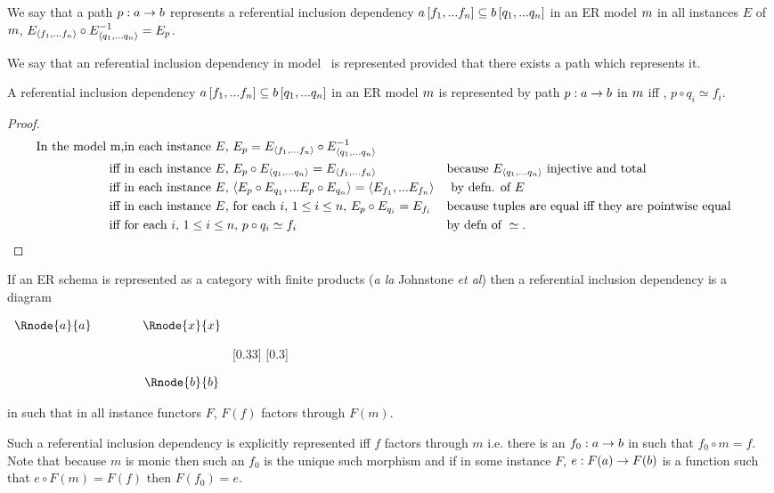 \begin{definition}
We say that a path $p:a \rightarrow b$ represents a referential inclusion dependency
$a\left[f_1,...f_n\right]\subseteq b\left[q_1,...q_n\right]$  in an ER model ${m}$ 
  in all instances $E$ of ${m}$, $E_{\langle f_1,...f_n\rangle} \circ E_{\langle q_1,...q_n\rangle}^{-1}=E_p$.
\end{definition}
We say that an referential inclusion dependency in model \genericmodel\ is represented provided that
there exists a path which represents it. 
\begin{lemma}
\label{refinclusionlemma}
A referential inclusion dependency
$a\left[f_1,...f_n\right]\subseteq b\left[q_1,...q_n\right]$  in an ER model ${m}$ is  represented 
by path $p:a \rightarrow b$ in ${m}$ iff  \foreachi, $p \circ q_i \simeq f_i$.
\end{lemma}
\begin{proof}
\begin{align*}
\text{In the model {m},}
            &\text{in each instance $E$, }E_p = E_{\langle f_1,...f_n\rangle} \circ E_{\langle q_1,...q_n\rangle}^{-1}  \\
\text{iff } & \text{in each instance $E$, } E_p \circ E_{\langle q_1,...q_n\rangle} = E_{\langle f_1,...f_n\rangle}  
                        && \text{because } E_{\langle q_1,...q_n\rangle} \text{ injective and total}   \\
\text{iff } & \text{in each instance $E$, } \langle E_p \circ E_{q_1},...E_p \circ E_{q_n}\rangle 
                                                      = \langle E_{f_1},...E_{f_n}\rangle
									                                            && \text{ by defn. of }E \\
\text{iff } & \text{in each instance $E$, for each $i$, $1 \leq i \leq n$, } E_p \circ E_{q_i} = E_{f_i} 
                                                              && \text{because tuples are equal iff they are pointwise equal}  \\
\text{iff } & \text{for each $i$, $1 \leq i \leq n$, } p \circ q_i \simeq f_i          && \text{by defn of } \simeq.
\end{align*}
\end{proof}


\begin{categoricalaside}
If an ER schema is represented as a category with finite products (\textit{a la} Johnstone \textit{et al}) then
a referential inclusion dependency is a  diagram
\begin{center}
$
\begin{array}{cp{0.75cm}c}
   \Rnode{a}{a}     & & \Rnode{x}{x}  \\[1.2cm]     
	                  & & \Rnode{b}{b}  
\end{array}
$
[0.33]
[0.3]
\idcomp
\end{center}
\noindent
in  such that in all instance functors $F$, 
$F(f)$ factors through $F(m)$.

Such a referential inclusion dependency is explicitly represented iff
 $f$ factors through $m$ i.e. there is an $f_0: a \rightarrow b$ in  such that 
$f_0 \circ m =f$. Note that because $m$ is monic then such an $f_0$ is the unique such morphism and if in some instance $F$,
$e: F(a) \rightarrow F(b)$ is a function such that $e \circ F(m) = F(f)$ then $F(f_0)=e$. 
\end{categoricalaside}

